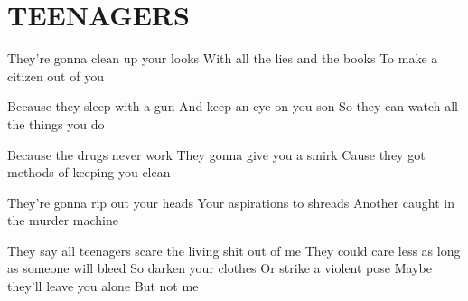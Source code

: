 \documentclass[../../../songbook.tex]{subfiles}
\begin{document}
\TabPositions{9.5cm} %
\section*{TEENAGERS}
{}
\vspace{0.5cm}
They're gonna clean up your looks	     \newline                     
With all the lies and the books		     \newline                    
To make a citizen out of you			 \newline

Because they sleep with a gun				 \newline
And keep an eye on you son					 \newline
So they can watch all the things you do		 \newline
     
Because the drugs never work                			\newline                      
They gonna give you a smirk            				\newline                              
Cause they got methods of keeping you clean     			\newline      
                                   
They're gonna rip out your heads         			\newline                        
Your aspirations to shreads             			\newline                               
Another caught in the murder machine         			\newline             

\-\hspace{1cm} They say all teenagers scare the living shit out of me	 \newline
\-\hspace{1cm} They could care less as long as someone will bleed		 \newline
\-\hspace{1cm} So darken your clothes									 \newline
\-\hspace{1cm} Or strike a violent pose									 \newline
\-\hspace{1cm} Maybe they'll leave you alone							 \newline
\-\hspace{1cm} But not me												 \newline
\end{document}
